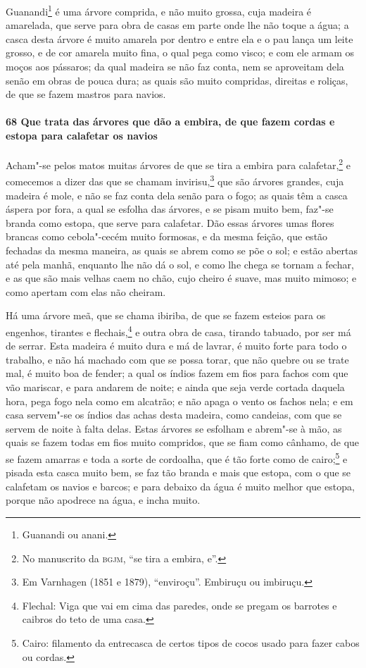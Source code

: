 \begin{linenumbers}
Guanandi\footnote{ Guanandi ou anani.} é uma árvore comprida, e não muito grossa, cuja
madeira é amarelada, que serve para obra de casas em parte onde lhe não toque a água; a
casca desta árvore é muito amarela por dentro e entre ela e o pau lança um leite grosso, e
de cor amarela muito fina, o qual pega como visco; e com ele armam os moços aos pássaros;
da qual madeira se não faz conta, nem se aproveitam dela senão em obras de pouca dura; as
quais são muito compridas, direitas e roliças, de que se fazem mastros para navios.

\paragraph{68 Que trata das árvores que dão a embira, de que fazem cordas e estopa para
calafetar os navios}\quad
Acham"-se pelos matos muitas árvores de que se tira a embira para calafetar,\footnote{ No
manuscrito da \textsc{bgjm}, ``se tira a embira, e''.} e comecemos a dizer das que se
chamam invirisu,\footnote{ Em Varnhagen (1851 e 1879), ``enviroçu''. Embiruçu ou
imbiruçu.} que são árvores grandes, cuja madeira é mole, e não se faz conta dela senão
para o fogo; as quais têm a casca áspera por fora, a qual se esfolha das árvores, e se
pisam muito bem, faz"-se branda como estopa, que serve para calafetar. Dão essas árvores
umas flores brancas como cebola"-cecém muito formosas, e da mesma feição, que estão
fechadas da mesma maneira, as quais se abrem como se põe o sol; e estão abertas até pela
manhã, enquanto lhe não dá o sol, e como lhe chega se tornam a fechar, e as que são mais
velhas caem no chão, cujo cheiro é suave, mas muito mimoso; e como apertam com elas não
cheiram.

Há uma árvore meã, que se chama ibiriba, de que se fazem esteios para os engenhos,
tirantes e flechais,\footnote{ Flechal: Viga que vai em cima das paredes, onde se pregam
os barrotes e caibros do teto de uma casa.} e outra obra de casa, tirando tabuado, por ser
má de serrar. Esta madeira é muito dura e má de lavrar, é muito forte para todo o
trabalho, e não há machado com que se possa torar, que não quebre ou se trate mal, é muito
boa de fender; a qual os índios fazem em fios para fachos com que vão mariscar, e para
andarem de noite; e ainda que seja verde cortada daquela hora, pega fogo nela como em
alcatrão; e não apaga o vento os fachos nela; e em casa servem"-se os índios das achas
desta madeira, como candeias, com que se servem de noite à falta delas. Estas árvores se
esfolham e abrem"-se à mão, as quais se fazem todas em fios muito compridos, que se fiam
como cânhamo, de que se fazem amarras e toda a sorte de cordoalha, que é tão forte como de
cairo;\footnote{ Cairo: filamento da entrecasca de certos tipos de cocos usado para fazer
cabos ou cordas.} e pisada esta casca muito bem, se faz tão branda e mais que estopa, com
o que se calafetam os navios e barcos; e para debaixo da água é muito melhor que estopa,
porque não apodrece na água, e incha muito.


\end{linenumbers}

